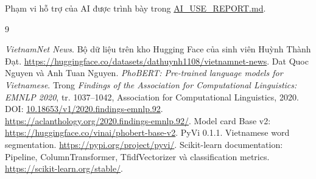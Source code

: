 \documentclass[12pt,a4paper]{report}
\begin{document}
Phạm vi hỗ trợ của AI được trình bày trong \href{https://github.com/dathuynh1108/CO5177-PFDAV/blob/main/AI\_USE\_REPORT.md}{AI\_USE\_REPORT.md}.
\begin{thebibliography}{9}
 \emph{VietnamNet News}. Bộ dữ liệu trên kho Hugging Face của sinh viên Huỳnh Thành Đạt. \url{https://huggingface.co/datasets/dathuynh1108/vietnamnet-news}.
 Dat Quoc Nguyen và Anh Tuan Nguyen. \emph{PhoBERT: Pre-trained language models for Vietnamese}. Trong \emph{Findings of the Association for Computational Linguistics: EMNLP 2020}, tr. 1037--1042, Association for Computational Linguistics, 2020. DOI: \href{https://doi.org/10.18653/v1/2020.findings-emnlp.92}{10.18653/v1/2020.findings-emnlp.92}. \url{https://aclanthology.org/2020.findings-emnlp.92/}. Model card Base v2: \url{https://huggingface.co/vinai/phobert-base-v2}.
 PyVi 0.1.1. Vietnamese word segmentation. \url{https://pypi.org/project/pyvi/}.
 Scikit-learn documentation: Pipeline, ColumnTransformer, TfidfVectorizer và classification metrics. \url{https://scikit-learn.org/stable/}.
\end{thebibliography}
\end{document}
